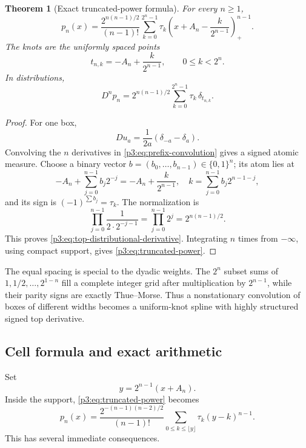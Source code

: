 \documentclass[11pt,oneside]{article}
\numberwithin{equation}{section}
\newtheorem{theorem}{Theorem}[section]
\theoremstyle{definition}
\theoremstyle{remark}
\begin{document}
\begin{theorem}[Exact truncated-power formula]
\label{p3:thm:truncated-power}
For every $n\ge1$,
\begin{equation}
 \boxed{
 p_n(x)=\frac{2^{n(n-1)/2}}{(n-1)!}
 \sum_{k=0}^{2^n-1}\tau_k
 \left(x+A_n-\frac{k}{2^{n-1}}\right)_+^{n-1}.}
 \label{p3:eq:truncated-power}
\end{equation}
The knots are the uniformly spaced points
\begin{equation}
 t_{n,k}=-A_n+\frac{k}{2^{n-1}},
 \qquad 0\le k<2^n.
 \label{p3:eq:knots}
\end{equation}
In distributions,
\begin{equation}
 D^np_n=2^{n(n-1)/2}\sum_{k=0}^{2^n-1}\tau_k\,\delta_{t_{n,k}}.
 \label{p3:eq:top-distributional-derivative}
\end{equation}
\end{theorem}

\begin{proof}
For one box,
\[
 Du_a=\frac{1}{2a}(\delta_{-a}-\delta_a).
\]
Convolving the $n$ derivatives in \cref{p3:eq:prefix-convolution} gives a signed atomic
measure.  Choose a binary vector $b=(b_0,\ldots,b_{n-1})\in\{0,1\}^n$; its atom lies at
\[
 -A_n+\sum_{j=0}^{n-1}b_j2^{-j}
 =-A_n+\frac{k}{2^{n-1}},
 \quad
 k=\sum_{j=0}^{n-1}b_j2^{n-1-j},
\]
and its sign is $(-1)^{\sum b_j}=\tau_k$.  The normalization is
\[
 \prod_{j=0}^{n-1}\frac{1}{2\cdot2^{-j-1}}
 =\prod_{j=0}^{n-1}2^j=2^{n(n-1)/2}.
\]
This proves \cref{p3:eq:top-distributional-derivative}.  Integrating $n$ times from
$-\infty$, using compact support, gives \cref{p3:eq:truncated-power}.
\end{proof}

The equal spacing is special to the dyadic weights.  The $2^n$ subset sums of
$1,1/2,\ldots,2^{1-n}$ fill a complete integer grid after multiplication by
$2^{n-1}$, while their parity signs are exactly Thue--Morse.  Thus a nonstationary
convolution of boxes of different widths becomes a uniform-knot spline with highly
structured signed top derivative.

\subsection{Cell formula and exact arithmetic}

Set
\begin{equation}
 y=2^{n-1}(x+A_n).
 \label{p3:eq:cell-coordinate}
\end{equation}
Inside the support, \cref{p3:eq:truncated-power} becomes
\begin{equation}
 p_n(x)=\frac{2^{-(n-1)(n-2)/2}}{(n-1)!}
 \sum_{0\le k\le\lfloor y\rfloor}\tau_k(y-k)^{n-1}.
 \label{p3:eq:scaled-cell-formula}
\end{equation}
This has several immediate consequences.
\end{document}
